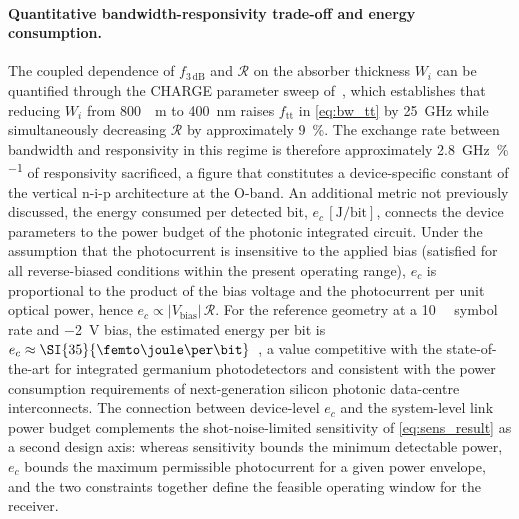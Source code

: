 \paragraph{Quantitative bandwidth-responsivity trade-off and energy consumption.}
The coupled dependence of $f_{3\,\mathrm{dB}}$ and $\mathcal{R}$ on the
absorber thickness $W_i$ can be quantified through the CHARGE parameter sweep
of~\cite{Alasio2024}, which establishes that reducing $W_i$ from \SI{800}{\nano
\metre} to \SI{400}{\nano\metre} raises $f_{\mathrm{tt}}$ in \cref{eq:bw_tt}
by \SI{25}{\giga\hertz} while simultaneously decreasing $\mathcal{R}$ by
approximately \SI{9}{\percent}. The exchange rate between bandwidth and
responsivity in this regime is therefore approximately
\SI{2.8}{\giga\hertz\per\percent} of responsivity sacrificed, a figure that
constitutes a device-specific constant of the vertical n-i-p architecture at
the O-band. An additional metric not previously discussed, the energy consumed
per detected bit, $e_c\,[\mathrm{J/bit}]$, connects the device parameters to
the power budget of the photonic integrated circuit. Under the assumption that
the photocurrent is insensitive to the applied bias (satisfied for all
reverse-biased conditions within the present operating range), $e_c$ is
proportional to the product of the bias voltage and the photocurrent per unit
optical power, hence $e_c \propto |V_{\mathrm{bias}}|\,\mathcal{R}$. For the
reference geometry at a \SI{10}{\giga\baud} symbol rate and \SI{-2}{\volt}
bias, the estimated energy per bit is $e_c \approx \SI{35}{\femto\joule\per
\bit}$~\cite{Alasio2024}, a value competitive with the state-of-the-art for
integrated germanium photodetectors and consistent with the power consumption
requirements of next-generation silicon photonic data-centre interconnects.
The connection between device-level $e_c$ and the system-level link power
budget complements the shot-noise-limited sensitivity of \cref{eq:sens_result}
as a second design axis: whereas sensitivity bounds the minimum detectable
power, $e_c$ bounds the maximum permissible photocurrent for a given power
envelope, and the two constraints together define the feasible operating window
for the receiver.

